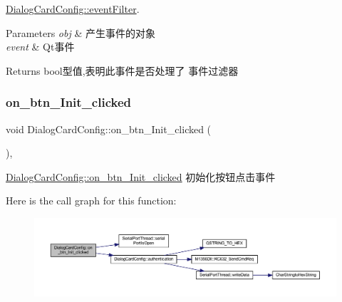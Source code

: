 \mbox{\hyperlink{class_dialog_card_config_a8d0540f792fe8b7a434e010a5c22a0df}{Dialog\+Card\+Config\+::event\+Filter}}. 


\begin{DoxyParams}{Parameters}
{\em obj} & 产生事件的对象 \\
\hline
{\em event} & Qt事件 \\
\hline
\end{DoxyParams}
\begin{DoxyReturn}{Returns}
bool型值,表明此事件是否处理了 事件过滤器 
\end{DoxyReturn}
\mbox{\label{class_dialog_card_config_a50f8d5a8eab6386e03a86094ae5098b7}} 
\subsubsection{\texorpdfstring{on\_btn\_Init\_clicked}{on\_btn\_Init\_clicked}}
{\footnotesize\ttfamily void Dialog\+Card\+Config\+::on\+\_\+btn\+\_\+\+Init\+\_\+clicked (\begin{DoxyParamCaption}{ }\end{DoxyParamCaption})\hspace{0.3cm}{\ttfamily [private]}, {\ttfamily [slot]}}



\mbox{\hyperlink{class_dialog_card_config_a50f8d5a8eab6386e03a86094ae5098b7}{Dialog\+Card\+Config\+::on\+\_\+btn\+\_\+\+Init\+\_\+clicked}} 初始化按钮点击事件 

Here is the call graph for this function\+:
\nopagebreak
\begin{figure}[H]
\begin{center}
\leavevmode
\includegraphics[width=350pt]{class_dialog_card_config_a50f8d5a8eab6386e03a86094ae5098b7_cgraph}
\end{center}
\end{figure}
\mbox{\label{class_dialog_card_config_a1959f4e04b85a8366ca705e31a4db85c}} 
